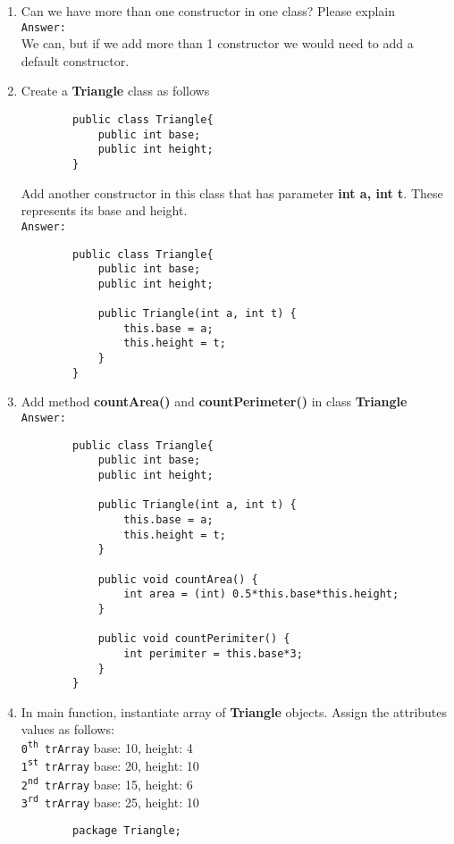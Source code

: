 \documentclass[12pt,titlepage]{article}
\begin{document}
\begin{enumerate}
    \item Can we have more than one constructor in one class? Please explain
    \mbox{}\\ \texttt{Answer:}
    \mbox{}\\ We can, but if we add more than 1 constructor we would need to add a default constructor.
    \item Create a \textbf{Triangle} class as follows
    \begin{verbatim}
        public class Triangle{
            public int base;
            public int height;
        }
    \end{verbatim}
    Add another constructor in this class that has parameter \textbf{int a, int t}. These represents its base and height.
    \mbox{}\\ \texttt{Answer:}
    \begin{verbatim}
        public class Triangle{
            public int base;
            public int height;

            public Triangle(int a, int t) {
                this.base = a;
                this.height = t;
            }
        }
    \end{verbatim}
    \item Add method \textbf{countArea()} and \textbf{countPerimeter()} in class \textbf{Triangle}
    \mbox{}\\ \texttt{Answer:}
    \begin{verbatim}
        public class Triangle{
            public int base;
            public int height;

            public Triangle(int a, int t) {
                this.base = a;
                this.height = t;
            }

            public void countArea() {
                int area = (int) 0.5*this.base*this.height;
            }

            public void countPerimiter() {
                int perimiter = this.base*3;
            }
        }
    \end{verbatim}
    \item In main function, instantiate array of \textbf{Triangle} objects. Assign the attributes values as follows:
    \mbox{}\\ \texttt{0\textsuperscript{th} trArray} base: 10, height: 4
    \mbox{}\\ \texttt{1\textsuperscript{st} trArray} base: 20, height: 10
    \mbox{}\\ \texttt{2\textsuperscript{nd} trArray} base: 15, height: 6
    \mbox{}\\ \texttt{3\textsuperscript{rd} trArray} base: 25, height: 10
    \begin{verbatim}
        package Triangle;


\end{verbatim}
\end{enumerate}
\end{document}
